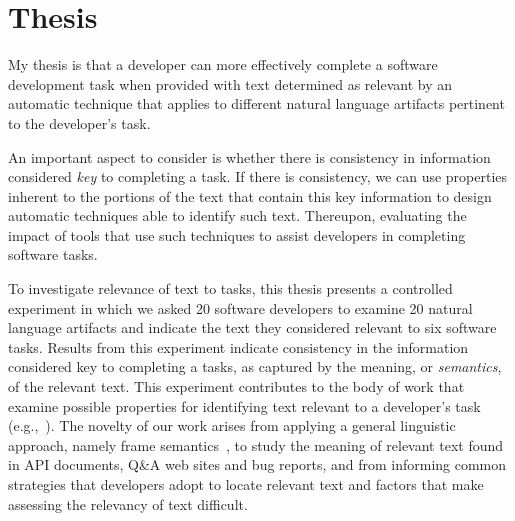 

\section{Thesis}
\label{cp1:thesis}


My thesis is that 
a developer can more effectively complete a software development task when  provided
with text  determined as relevant 
by an automatic technique that applies to 
different natural language artifacts pertinent to the developer's task.
  










An important aspect to consider
is whether there is consistency in 
information considered \emph{key} to completing a task.
If there is consistency, we can use properties inherent 
to the portions of the text that contain this key information 
to design automatic techniques able to identify such text.
Thereupon, evaluating the impact of tools that use such techniques to assist developers in completing software tasks.




To investigate relevance of text to tasks,
this thesis presents 
a controlled experiment in which we asked 20 software developers to examine 20 natural language artifacts
and indicate  the text they considered relevant to six software tasks.
Results from this experiment indicate consistency in 
the information considered key to completing a tasks, as captured by the meaning, or \textit{semantics}, of the
relevant text.
This experiment contributes to the body of work that examine possible properties for identifying text relevant to a developer's task (e.g.,~\cite{Forward2002, Jiang2016b, Robillard2015, Bavota2016}).
The novelty of our work arises from 
applying a general
linguistic approach, namely frame semantics~\cite{fillmore1976frame, Baker1998}, to study the meaning of relevant text found in 
API documents, Q\&A web sites and bug reports,
and from 
informing common strategies that developers adopt to locate relevant text 
and factors that make assessing the relevancy of text difficult.








